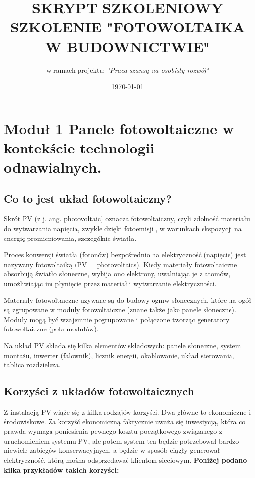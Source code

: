 \documentclass[12pt,a4paper]{article}
\title{SKRYPT SZKOLENIOWY SZKOLENIE "FOTOWOLTAIKA W BUDOWNICTWIE"}
\author{w ramach projektu: \textit{"Praca szansą na osobisty rozwój"} }
\date{\today}
\begin{document}
\maketitle
\tableofcontents

\section{Moduł 1 Panele fotowoltaiczne w kontekście technologii odnawialnych. }

\subsection{Co to jest układ fotowoltaiczny? }
Skrót PV (z j. ang. photovoltaic) oznacza fotowoltaiczny, czyli zdolność 
materiału do wytwarzania napięcia, zwykle dzięki fotoemisji , w warunkach 
ekspozycji na energię promieniowania, szczególnie światła. 

Proces konwersji światła (fotonów) bezpośrednio na elektryczność 
(napięcie) jest nazywany fotowoltaiką (PV = photovoltaics). Kiedy 
materiały fotowoltaiczne absorbują światło słoneczne, wybija ono 
elektrony, uwalniając je z atomów, umożliwiając im płynięcie przez 
materiał i wytwarzanie elektryczności. 

Materiały fotowoltaiczne używane są do budowy ogniw słonecznych, które 
na ogół są zgrupowane w moduły fotowoltaiczne  (znane także jako panele 
słoneczne). Moduły mogą być wzajemnie pogrupowane i połączone tworząc 
generatory fotowoltaiczne  (pola modułów). 

Na układ PV składa się kilka elementów składowych: panele słoneczne, 
system montażu, inwerter (falownik), licznik energii, okablowanie, układ 
sterowania, tablica rozdzielcza. 

\subsection{Korzyści z układów fotowoltaicznych }

Z instalacją PV wiąże się z kilka rodzajów korzyści. Dwa główne to 
ekonomiczne i środowiskowe. Za korzyść ekonomiczną faktycznie uważa się 
inwestycją, która co prawda wymaga poniesienia pewnego kosztu 
początkowego związanego z uruchomieniem systemu PV, ale potem system ten 
będzie potrzebował bardzo niewiele zabiegów konserwacyjnych, a będzie w 
sposób ciągły generował elektryczność, którą można odsprzedawać klientom 
sieciowym. \textbf{Poniżej podano kilka przykładów takich korzyści: }
\end{document}
